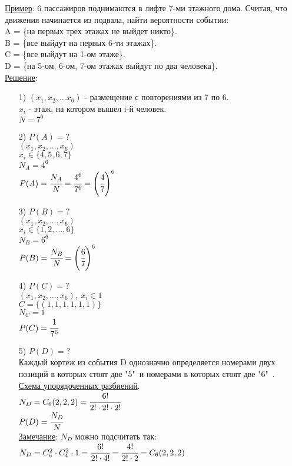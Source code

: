 \underline{Пример}: 6 пассажиров поднимаются в лифте 7-ми этажного дома. Считая, что движения начинается из подвала, найти вероятности событии: \\
A = \{на первых трех этажах не выйдет никто\}. \\
B = \{все выйдут на первых 6-ти этажах\}. \\
C = \{все выйдут на 1-ом этаже\}. \\
D = \{на 5-ом, 6-ом, 7-ом этажах выйдут по два человека\}. \\
\underline{Решение}: 
\begin{enumerate}
\item[1)] $(x_1, x_2, \ldots x_6)$ - размещение с повторениями из 7 по 6. \\
$x_i$ - этаж, на котором вышел i-й человек. \\
$N = 7^6$ \\

\item[2)] $P(A) = ?$ \\
$(x_1, x_2, \ldots, x_6)$ \\
$x_i \in \{4,5,6,7\}$ \\
$N_A = 4^6$ \\
$P(A) = \cfrac{N_A}{N} = \cfrac{4^6}{7^6} = \left( \cfrac{4}{7} \right)^6$ \\

\item[3)] $P(B) = ?$ \\
$(x_1, x_2, \ldots, x_6)$ \\
$x_i \in \{1,2,\ldots, 6\}$ \\
$N_B = 6^6$ \\
$P(B) = \cfrac{N_B}{N} = \left( \cfrac{6}{7} \right)^6$ \\

\item[4)] $P(C) = ?$ \\
$(x_1, x_2, \ldots, x_6), \ x_i \in {1}$ \\
$C = \{ (1,1,1,1,1,1)\}$ \\
$N_C = 1$ \\
$P(C) = \cfrac{1}{7^6}$ \\

\item[5)] $P(D) = ?$ \\
Каждый кортеж из события D однозначно определяется номерами двух позиций в которых стоят две "5"\ и номерами в которых стоят две "6"\ . \\
\underline{Схема упорядоченных разбиений}. \\
$N_D = C_6(2,2,2) = \cfrac{6!}{2! \cdot 2! \cdot 2!}$ \\
$P(D) = \cfrac{N_D}{N}$ \\

\underline{Замечание}: $N_D$ можно подсчитать так: \\
$N_D = C^2_6 \cdot C^2_4 \cdot 1 = \cfrac{6!}{2! \cdot 4!} = \cfrac{4!}{2! \cdot 2} = C_6 (2,2,2)$ \\
\end{enumerate}






















